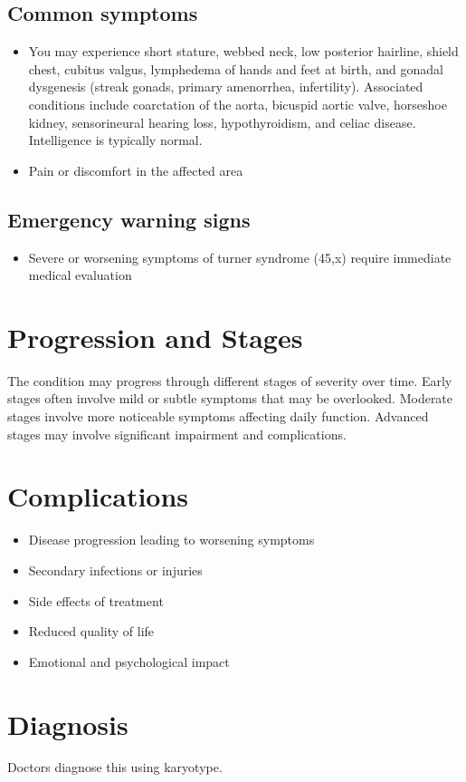\subsection{Common symptoms}
\begin{itemize}[noitemsep]
  \item You may experience short stature, webbed neck, low posterior hairline, shield chest, cubitus valgus, lymphedema of hands and feet at birth, and gonadal dysgenesis (streak gonads, primary amenorrhea, infertility). Associated conditions include coarctation of the aorta, bicuspid aortic valve, horseshoe kidney, sensorineural hearing loss, hypothyroidism, and celiac disease. Intelligence is typically normal.
  \item Pain or discomfort in the affected area
  \end{itemize}

\subsection{Emergency warning signs}
\begin{itemize}[noitemsep]
  \item Severe or worsening symptoms of turner syndrome (45,x) require immediate medical evaluation
\end{itemize}
\section{Progression and Stages}
The condition may progress through different stages of severity over time. Early stages often involve mild or subtle symptoms that may be overlooked. Moderate stages involve more noticeable symptoms affecting daily function. Advanced stages may involve significant impairment and complications.
\section{Complications}
\begin{itemize}[noitemsep]
  \item Disease progression leading to worsening symptoms
  \item Secondary infections or injuries
  \item Side effects of treatment
  \item Reduced quality of life
  \item Emotional and psychological impact
\end{itemize}
\section{Diagnosis}
Doctors diagnose this using karyotype.

